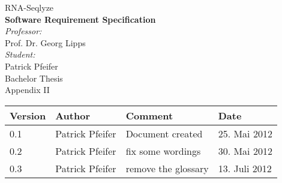 \begin{titlepage}
\thispagestyle{plain}
\begin{center}
%
{ \sffamily\Huge RNA-Seqlyze }
\\[1cm]
{ \sffamily\LARGE \bfseries Software Requirement Specification }
\\[2cm]
%
\large\emph{Professor:}\\
	Prof. Dr. Georg Lipps
\\[1cm]
\large\emph{Student:}\\
	Patrick Pfeifer
%
\\[2cm]
{ \LARGE Bachelor Thesis }\\[0.5cm]
{ \Large Appendix II }
%
\\\vfill
%
\listoftodos\vfill
%
\setlength{\aboverulesep}{0pt}
\setlength{\belowrulesep}{0pt}
\setlength{\extrarowheight}{.75ex}
\begin{tabularx}{\textwidth}{|p{1.6cm}|>{\raggedright}p{3cm}|X|p{3cm}|}
\midrule
\rowcolor[gray]{0.8}
	Version & Author & Comment & Date
\\\midrule
	  0.1
	& Patrick Pfeifer
	& Document created
	& 25. Mai 2012
\\\midrule
	  0.2
	& Patrick Pfeifer
	& fix some wordings 
	& 30. Mai 2012
\\\midrule
	  0.3
	& Patrick Pfeifer
	& remove the glossary
	& 13. Juli 2012
\\\midrule
\end{tabularx}
\end{center}
\end{titlepage}
